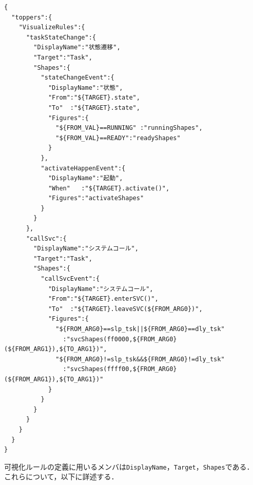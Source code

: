 {\begin{table}[p]
\begin{flushleft}
\footnotesize
\bkcounttrue
\caption{可視化ルールファイルで可視化ルールを定義した例}
\label{visualizeRuleSample}
\begin{breakbox}
\setlength{\baselineskip}{\normalbaselineskip}
\begin{verbatim}
{
  "toppers":{
    "VisualizeRules":{
      "taskStateChange":{
        "DisplayName":"状態遷移",
        "Target":"Task",
        "Shapes":{
          "stateChangeEvent":{
            "DisplayName":"状態",
            "From":"${TARGET}.state",
            "To"  :"${TARGET}.state",
            "Figures":{
              "${FROM_VAL}==RUNNING" :"runningShapes",
              "${FROM_VAL}==READY":"readyShapes"
            }
          },
          "activateHappenEvent":{
            "DisplayName":"起動",
            "When"   :"${TARGET}.activate()",
            "Figures":"activateShapes"
          }
        }
      },
      "callSvc":{
        "DisplayName":"システムコール",
        "Target":"Task",
        "Shapes":{
          "callSvcEvent":{
            "DisplayName":"システムコール",
            "From":"${TARGET}.enterSVC()",
            "To"  :"${TARGET}.leaveSVC(${FROM_ARG0})",
            "Figures":{
              "${FROM_ARG0}==slp_tsk||${FROM_ARG0}==dly_tsk"
                :"svcShapes(ff0000,${FROM_ARG0}(${FROM_ARG1}),${TO_ARG1})",
              "${FROM_ARG0}!=slp_tsk&&${FROM_ARG0}!=dly_tsk"
                :"svcShapes(ffff00,${FROM_ARG0}(${FROM_ARG1}),${TO_ARG1})"
            }
          }
        }
      }
    }
  }
}
\end{verbatim}
\end{breakbox}
\end{flushleft}
\end{table}}

可視化ルールの定義に用いるメンバは{\tt DisplayName}，{\tt Target}，{\tt Shapes}である．
これらについて，以下に詳述する．

